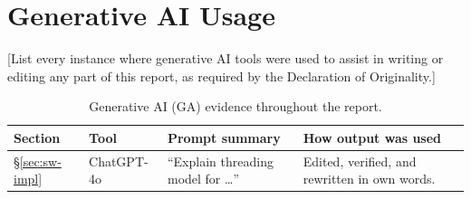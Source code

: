\chapter{Generative AI Usage}
\label{app:ai-usage}

[List every instance where generative AI tools were used to assist
in writing or editing any part of this report, as required by the
Declaration of Originality.]

\begin{table}[H]
    \centering
    \caption{Generative AI (GA) evidence throughout the report.}
    \label{tab:ga-evidence}
    \begin{tabular}{@{} l l p{3.5cm} p{4.5cm} @{}}
        \toprule
        \textbf{Section} & \textbf{Tool} & \textbf{Prompt summary}
            & \textbf{How output was used} \\
        \midrule
        \S\ref{sec:sw-impl} & ChatGPT-4o
            & ``Explain threading model for \ldots''
            & Edited, verified, and rewritten in own words. \\
        \bottomrule
    \end{tabular}
\end{table}
